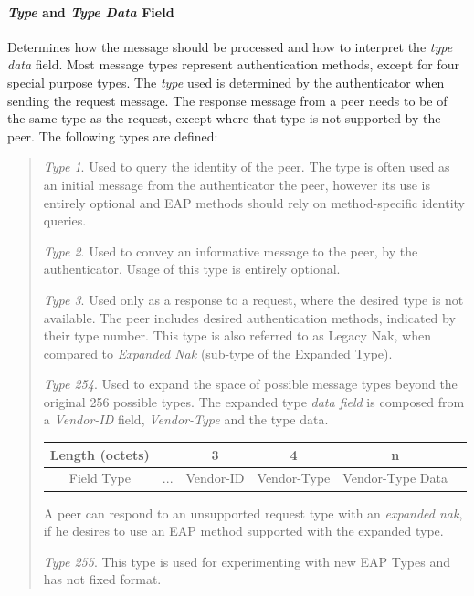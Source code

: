 \paragraph{\textit{Type} and \textit{Type Data} Field}
\label{text:eap:type}
Determines how the message should be processed and how to interpret the \textit{type data} field.
Most message types represent authentication methods, except for four special purpose types.
The \textit{type} used is determined by the authenticator when sending the request message. The response message from a peer needs to be of the same type as the request, except where that type is not supported by the peer.
The following types are defined:

\begin{quote}
\begin{description}
	\label{def:eap-identitiy}
	\item[Identity] \textit{Type 1}. Used to query the identity of the peer. The type is often used as an initial message from the authenticator the peer, however its use is entirely optional and EAP methods should rely on method-specific identity queries.
	
	\item[Notification]\textit{Type 2}. Used to convey an informative message to the peer, by the authenticator. Usage of this type is entirely optional.
	\item[Nak]\textit{Type 3}. Used only as a response to a request, where the desired type is not available.
	The peer includes desired authentication methods, indicated by their type number.
	This type is also referred to as Legacy Nak, when compared to \textit{Expanded Nak} (sub-type of the Expanded Type).
	\item[Expanded Type] \textit{Type 254}. 
	Used to expand the space of possible message types beyond the original 256 possible types.
	The expanded type \textit{data field} is composed from a \textit{Vendor-ID} field, \textit{Vendor-Type} and the type data.
	\bigskip
	\begin{center}
		\begin{tabular}{|c|c|c|c|c|c|}
		\cline{2-5}
		\hline
		Length (octets) & & 3 & 4 & n\\
		\hline
		Field Type & ... & Vendor-ID & Vendor-Type & Vendor-Type Data\\
		\hline
		\end{tabular}
	\end{center}
	\bigskip
	A peer can respond to an unsupported request type with an \textit{expanded nak}, if he desires to use an EAP method supported with the expanded type.
	\item[Experimental] \textit{Type 255}. This type is used for experimenting with new EAP Types and has not fixed format.
\end{description}
\end{quote}


